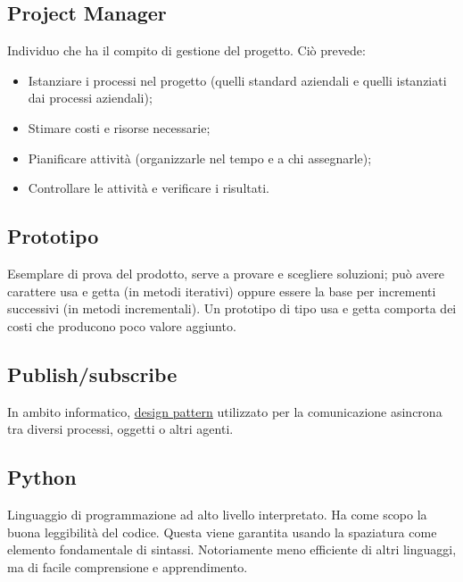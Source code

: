 	\subsection{Project Manager}
	\label{sec:projectmanager}
	Individuo che ha il compito di gestione del progetto. Ciò prevede:
	\begin{itemize}
	\item Istanziare i processi nel progetto (quelli standard aziendali e quelli istanziati dai processi aziendali);
	\item Stimare costi e risorse necessarie;
	\item Pianificare attività (organizzarle nel tempo e a chi assegnarle);
	\item Controllare le attività e verificare i risultati.
	\end{itemize}

	\subsection{Prototipo}
	\label{sec:prototipo}
	Esemplare di prova del prodotto, serve a provare e scegliere soluzioni; può avere carattere usa e getta (in metodi iterativi) oppure essere la base per incrementi successivi (in metodi incrementali).
	Un prototipo di tipo usa e getta comporta dei costi che producono poco valore aggiunto.\newpage
	\subsection{Publish/subscribe}
\label{sec:pubsub}
In ambito informatico, \underline{\hyperref[sec:designpattern]{design pattern}} utilizzato per la comunicazione asincrona tra diversi processi, oggetti o altri agenti.

\subsection{Python}
Linguaggio di programmazione ad alto livello interpretato. Ha come scopo la buona leggibilità del codice. Questa viene garantita usando la spaziatura come elemento fondamentale di sintassi. Notoriamente meno efficiente di altri linguaggi, ma di facile comprensione e apprendimento.

\newpage


